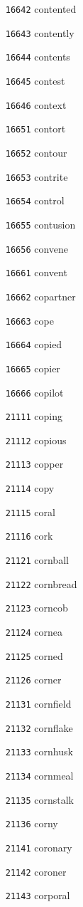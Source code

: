 \documentclass[twoside,11pt]{article}
\begin{document}
\begin{multicols}{5}
\begin{enumerate}
\item[\texttt{16642}] contented
\item[\texttt{16643}] contently
\item[\texttt{16644}] contents
\item[\texttt{16645}] contest
\item[\texttt{16646}] context
\item[\texttt{16651}] contort
\item[\texttt{16652}] contour
\item[\texttt{16653}] contrite
\item[\texttt{16654}] control
\item[\texttt{16655}] contusion
\item[\texttt{16656}] convene
\item[\texttt{16661}] convent
\item[\texttt{16662}] copartner
\item[\texttt{16663}] cope
\item[\texttt{16664}] copied
\item[\texttt{16665}] copier
\item[\texttt{16666}] copilot
\item[\texttt{21111}] coping
\item[\texttt{21112}] copious
\item[\texttt{21113}] copper
\item[\texttt{21114}] copy
\item[\texttt{21115}] coral
\item[\texttt{21116}] cork
\item[\texttt{21121}] cornball
\item[\texttt{21122}] cornbread
\item[\texttt{21123}] corncob
\item[\texttt{21124}] cornea
\item[\texttt{21125}] corned
\item[\texttt{21126}] corner
\item[\texttt{21131}] cornfield
\item[\texttt{21132}] cornflake
\item[\texttt{21133}] cornhusk
\item[\texttt{21134}] cornmeal
\item[\texttt{21135}] cornstalk
\item[\texttt{21136}] corny
\item[\texttt{21141}] coronary
\item[\texttt{21142}] coroner
\item[\texttt{21143}] corporal

\end{enumerate}
\end{multicols}
\end{document}
